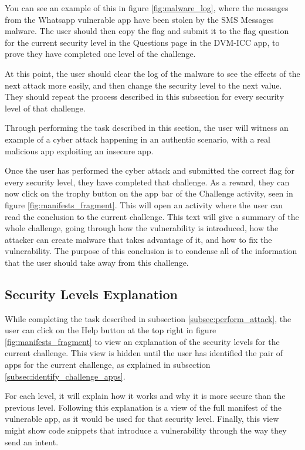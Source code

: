     You can see an example of this in figure \ref{fig:malware_log}, where the messages from the Whatsapp vulnerable app have been stolen by the SMS Messages malware. The user should then copy the flag and submit it to the flag question for the current security level in the Questions page in the DVM-ICC app, to prove they have completed one level of the challenge. 
    
    At this point, the user should clear the log of the malware to see the effects of the next attack more easily, and then change the security level to the next value. They should repeat the process described in this subsection for every security level of that challenge.
    
    Through performing the task described in this section, the user will witness an example of a cyber attack happening in an authentic scenario, with a real malicious app exploiting an insecure app.
    
    Once the user has performed the cyber attack and submitted the correct flag for every security level, they have completed that challenge. As a reward, they can now click on the trophy button on the app bar of the Challenge activity, seen in figure \ref{fig:manifests_fragment}. This will open an activity where the user can read the conclusion to the current challenge. This text will give a summary of the whole challenge, going through how the vulnerability is introduced, how the attacker can create malware that takes advantage of it, and how to fix the vulnerability. The purpose of this conclusion is to condense all of the information that the user should take away from this challenge.
    
    \subsection{Security Levels Explanation}
        \label{subsec:security_levels_explanation}
        
    While completing the task described in subsection \ref{subsec:perform_attack}, the user can click on the Help button at the top right in figure \ref{fig:manifests_fragment} to view an explanation of the security levels for the current challenge. This view is hidden until the user has identified the pair of apps for the current challenge, as explained in subsection \ref{subsec:identify_challenge_apps}.
    
    For each level, it will explain how it works and why it is more secure than the previous level. Following this explanation is a view of the full manifest of the vulnerable app, as it would be used for that security level. Finally, this view might show code snippets that introduce a vulnerability through the way they send an intent.
    

